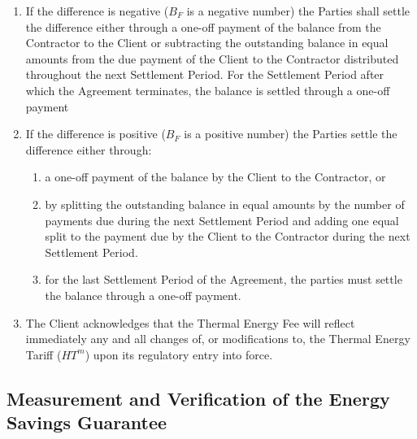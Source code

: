 \begin{enumerate}
	\item If the difference is negative ($B_F$ is a negative number) the Parties shall settle the difference either through a one-off payment of the balance from the Contractor to the Client or subtracting the outstanding balance in equal amounts from the due payment of the Client to the Contractor distributed throughout the next Settlement Period. For the Settlement Period after which the Agreement terminates, the balance is settled through a one-off payment

	\item If the difference is positive ($B_F$ is a positive number) the Parties settle the difference either through:
	\begin{enumerate}
	\item a one-off payment of the balance by the Client to the Contractor, or
	\item by splitting the outstanding balance in equal amounts by the number of payments due during the next Settlement Period and adding one equal split to the payment due by the Client to the Contractor during the next Settlement Period.
	\item for the last Settlement Period of the Agreement, the parties must settle the balance through a one-off payment.
	\end{enumerate}

	\item The Client acknowledges that the Thermal Energy Fee will reflect immediately any and all changes of, or modifications to, the Thermal Energy Tariff ($HT^m$) upon its regulatory entry into force.
\end{enumerate}


\subsection{Measurement and Verification of the Energy Savings Guarantee}

